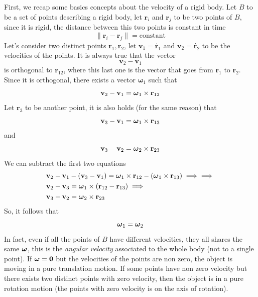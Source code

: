 \documentclass[10pt, letterpaper]{report}
\begin{document}
First, we recap some basics concepts about the velocity of a rigid body. Let $B$ to be a set of points describing a rigid body, let $\mathbf r_i$ and $\mathbf r_j$ to be two points of $B$, since it is rigid, the distance between this two points is constant in time\begin{equation}
    \|\mathbf r_i-\mathbf r_j\|=\text{constant}
\end{equation}
Let's consider two distinct points $\mathbf r_1,\mathbf r_2$, let $\mathbf v_1=\dot{\mathbf r_1}$ and $\mathbf v_2=\dot{\mathbf r_2}$ to be the velocities of the points. It is always true that the vector $$\mathbf v_2-\mathbf v_1 $$
is orthogonal to $\mathbf r_{12}$, where this last one is the vector that goes from $\mathbf r_1$ to $\mathbf r_2$. Since it is orthogonal, there exists a vector $\boldsymbol{\omega}_1$ such that\begin{equation}
    \mathbf v_2-\mathbf v_1 = {\boldsymbol{\omega}}_1\times \mathbf r_{12}
\end{equation}
Let $\mathbf r_3$ to be another point, it is also holds (for the same reason) that\begin{equation}
    \mathbf v_3-\mathbf v_1 = {\boldsymbol{\omega}}_1\times \mathbf r_{13}
\end{equation} 
and 
\begin{equation}
    \mathbf v_3-\mathbf v_2 = {\boldsymbol{\omega}}_2\times \mathbf r_{23}
\end{equation} 
We can subtract the first two equations\begin{align}
    &\mathbf v_2-\mathbf v_1-( \mathbf v_3-\mathbf v_1) = {\boldsymbol{\omega}}_1\times \mathbf r_{12}-({\boldsymbol{\omega}}_1\times \mathbf r_{13})\implies \implies \\ 
    &\mathbf v_2- \mathbf v_3 = {\boldsymbol{\omega}}_1\times 
    (\mathbf r_{12}-\mathbf r_{13})\implies \\ 
    &
     \mathbf v_3-\mathbf v_2 = {\boldsymbol{\omega}}_2\times \mathbf r_{23}
\end{align}
So, it follows that\begin{equation}
    {\boldsymbol{\omega}}_1={\boldsymbol{\omega}}_2
\end{equation}
In fact, even if all the points of $B$ have different velocities, they all shares the same ${\boldsymbol{\omega}}$, this is the \textit{angular velocity} associated to the whole body (not to a single point).
If ${\boldsymbol{\omega}} = \mathbf 0$ but the velocities of the points are non zero, the object is moving in a pure translation motion. If some points have non zero velocity but there exists two distinct points with zero velocity, then the object is in a pure rotation motion (the points with zero velocity is on the axis of rotation).\bigskip 
\end{document}
